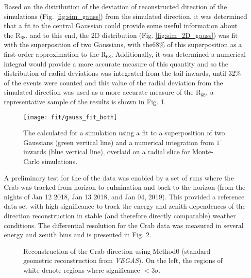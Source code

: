 \documentclass[main.tex]{subfiles}
\begin{document}
Based on the distribution of the deviation of reconstructed direction of the simulations (Fig. \ref{fig:sim_gauss}) from the simulated direction, it was determined that a fit to the central Gaussian could provide some useful information about the R$_{68}$, and to this end, the 2D distribution (Fig. \ref{fig:sim_2D_gauss}) was fit with the superposition of two Gaussians, with the68\% of this superposition as a first-order approximation to the R$_{68}$. Additionally, it was determined a numerical integral would provide a more accurate measure of this quantity and so the distribution of radial deviations was integrated from the tail inwards, until 32\% of the events were counted and this value of the radial deviation from the simulated direction was used as a more accurate measure of the R$_{68}$, a representative sample of the results is shown in Fig. \ref{fig:gauss_fit_both}.
\begin{figure}[htbp]
  \centering
  \texttt{[image: fit/gauss\_fit\_both]}
  \caption[\rse from the Gaussian fit and the numerical integral.]{The \rse calculated for a simulation using a fit to a superposition of two Gaussians (green vertical line) and a numerical integration from $1^\circ$ inwards (blue vertical line), overlaid on a radial slice for Monte-Carlo simulations.}
  \label{fig:gauss_fit_both}
\end{figure}

A preliminary test for the \rse of the data was enabled by a set of runs where the Crab was tracked from horizon to culmination and back to the horizon (from the nights of Jan 12 2018, Jan 13 2018, and Jan 04, 2019). This provided a reference data set with high significance to track the energy and zenith dependences of the direction reconstruction in stable (and therefore directly comparable) weather conditions. The differential resolution for the Crab data was measured in several energy and zenith bins and is presented in Fig. \ref{fig:crab_initial}.

\begin{figure}[H]
  \begin{center}
  \end{center}
  \caption[Crab direction reconstruction using Method0.]{Reconstruction of the Crab direction using Method0 (standard geometric reconstruction from \textit{VEGAS}). On the left, the regions of white denote regions where significance $<3\sigma$.}
  \label{fig:crab_initial}
\end{figure}
\end{document}
